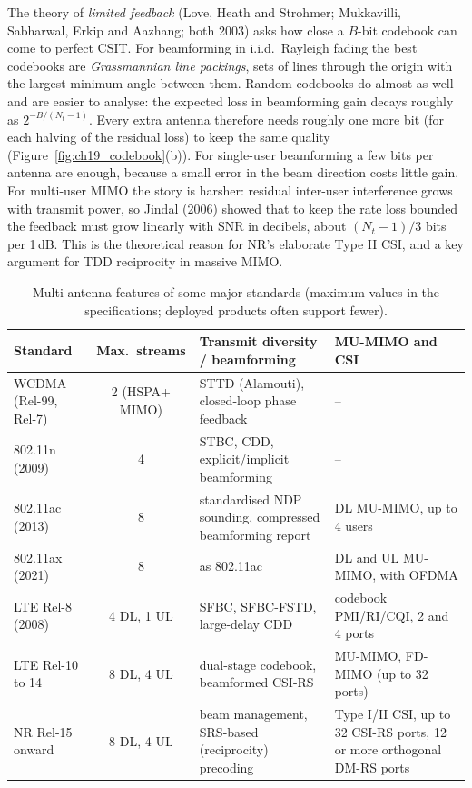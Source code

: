 The theory of \emph{limited feedback} (Love, Heath and Strohmer; Mukkavilli, Sabharwal, Erkip and
Aazhang; both 2003) asks how close a $B$-bit codebook can come to perfect CSIT. For beamforming
in i.i.d.\ Rayleigh fading the best codebooks are \emph{Grassmannian line packings}, sets of
lines through the origin with the largest minimum angle between them. Random codebooks do almost as
well and are easier to analyse: the expected loss in beamforming gain decays roughly as
$2^{-B/(N_t-1)}$. Every extra antenna therefore needs roughly one more bit (for each halving of
the residual loss) to keep the same quality (Figure~\ref{fig:ch19_codebook}(b)). For single-user
beamforming a few bits per antenna are enough, because a small error in the beam direction costs
little gain. For multi-user MIMO the story is harsher: residual inter-user interference grows with
transmit power, so Jindal (2006) showed that to keep the rate loss bounded the feedback must grow
linearly with SNR in decibels, about $(N_t-1)/3$ bits per 1\,dB. This is the theoretical reason for
NR's elaborate Type II CSI, and a key argument for TDD reciprocity in massive MIMO.

\begin{table}[htbp]\centering\small
\caption{Multi-antenna features of some major standards (maximum values in the specifications;
deployed products often support fewer).}
\label{tab:ch19:standards}
\begin{tabularx}{\linewidth}{@{}l c >{\raggedright\arraybackslash}X >{\raggedright\arraybackslash}X@{}}
\toprule
Standard & Max.\ streams & Transmit diversity / beamforming & MU-MIMO and CSI\\
\midrule
WCDMA (Rel-99, Rel-7) & 2 (HSPA+ MIMO) & STTD (Alamouti), closed-loop phase feedback & --\\
802.11n (2009) & 4 & STBC, CDD, explicit/implicit beamforming & --\\
802.11ac (2013) & 8 & standardised NDP sounding, compressed beamforming report & DL MU-MIMO, up to 4 users\\
802.11ax (2021) & 8 & as 802.11ac & DL and UL MU-MIMO, with OFDMA\\
LTE Rel-8 (2008) & 4 DL, 1 UL & SFBC, SFBC-FSTD, large-delay CDD & codebook PMI/RI/CQI, 2 and 4 ports\\
LTE Rel-10 to 14 & 8 DL, 4 UL & dual-stage codebook, beamformed CSI-RS & MU-MIMO, FD-MIMO (up to 32 ports)\\
NR Rel-15 onward & 8 DL, 4 UL & beam management, SRS-based (reciprocity) precoding & Type I/II CSI, up to 32 CSI-RS ports, 12 or more orthogonal DM-RS ports\\
\bottomrule
\end{tabularx}
\end{table}

